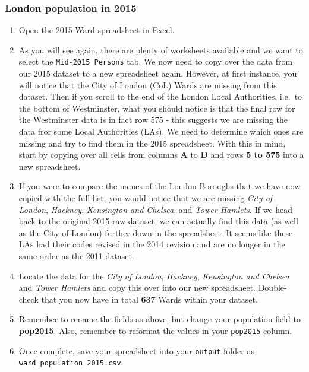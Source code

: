 \documentclass[
]{book}
\providecommand{\tightlist}{%
  \setlength{\itemsep}{0pt}\setlength{\parskip}{0pt}}
\begin{document}
\hypertarget{london-population-in-2015}{%
\subsubsection{London population in 2015}\label{london-population-in-2015}}

\begin{enumerate}
\def\labelenumi{\arabic{enumi}.}
\tightlist
\item
  Open the 2015 Ward spreadsheet in Excel.
\item
  As you will see again, there are plenty of worksheets available and we want to select the \texttt{Mid-2015\ Persons} tab. We now need to copy over the data from our 2015 dataset to a new spreadsheet again. However, at first instance, you will notice that the City of London (CoL) Wards are missing from this dataset. Then if you scroll to the end of the London Local Authorities, i.e.~to the bottom of Westminster, what you should notice is that the final row for the Westminster data is in fact row 575 - this suggests we are missing the data fror some Local Authorities (LAs). We need to determine which ones are missing and try to find them in the 2015 spreadsheet. With this in mind, start by copying over all cells from columns \textbf{A} to \textbf{D} and rows \textbf{5 to 575} into a new spreadsheet.
\item
  If you were to compare the names of the London Boroughs that we have now copied with the full list, you would notice that we are missing \emph{City of London}, \emph{Hackney}, \emph{Kensington and Chelsea}, and \emph{Tower Hamlets}. If we head back to the original 2015 raw dataset, we can actually find this data (as well as the City of London) further down in the spreadsheet. It seems like these LAs had their codes revised in the 2014 revision and are no longer in the same order as the 2011 dataset.
\item
  Locate the data for the \emph{City of London}, \emph{Hackney}, \emph{Kensington and Chelsea} and \emph{Tower Hamlets} and copy this over into our new spreadsheet. Double-check that you now have in total \textbf{637} Wards within your dataset.
\item
  Remember to rename the fields as above, but change your population field to \textbf{pop2015}. Also, remember to reformat the values in your \texttt{pop2015} column.
\item
  Once complete, save your spreadsheet into your \texttt{output} folder as \texttt{ward\_population\_2015.csv}.
\end{enumerate}
\end{document}
